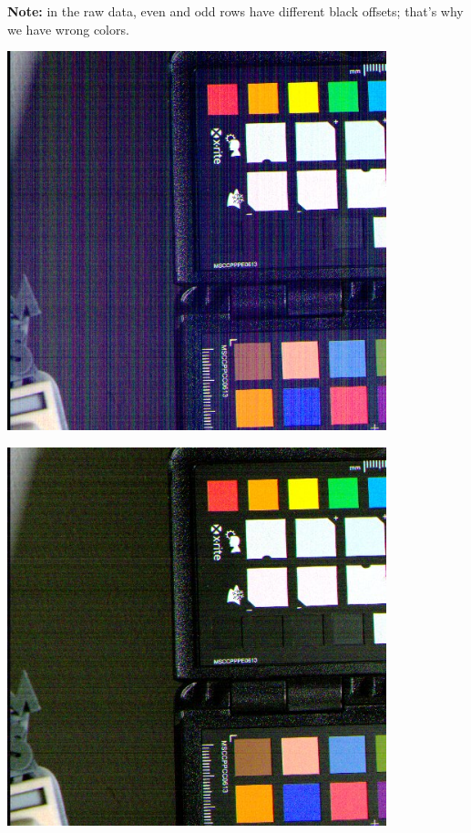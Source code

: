 \textbf{Note:} in the raw data, even and odd rows have different black offsets; that's why we have wrong colors. \\

\begin{center}
\includegraphics[height=11cm]{images/10ms+4-totally-raw-crop}
\end{center}

\begin{center}
\includegraphics[height=11cm]{images/10ms+4-no-blackcol-crop}
\end{center}

